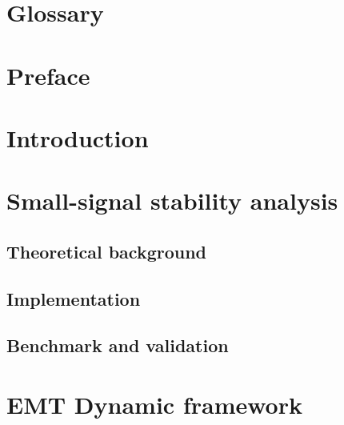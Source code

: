 \documentclass[a4paper, 11pt, titlepage, twoside]{article}
\begin{document}
\cleardoublepage

\tableofcontents

\newpage
\listoffigures

\newpage
\begingroup
\setlength{\parskip}{0pt}
\listoftables %
\endgroup

\setlength{\abovedisplayskip}{5pt} %
\setlength{\belowdisplayskip}{5pt} %

\section*{Glossary}

\newpage

\section*{Preface}

\newpage

\section{Introduction}\label{Introduction}

\newpage

\section{Small-signal stability analysis}\label{SmallSignal}
\subsection{Theoretical background}

\subsection{Implementation}

\subsection{Benchmark and validation}

\newpage

\section{EMT Dynamic framework}\label{Chap2}

\newpage
\end{document}
